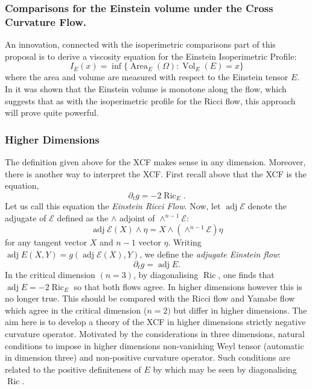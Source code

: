\documentclass[12pt]{amsart}
\begin{document}
\subsubsection*{Comparisons for the Einstein volume under the Cross Curvature Flow.}
\label{sec:orgheadline10}
An innovation, connected with the isoperimetric comparisons part of this proposal is to derive a viscosity equation for the Einstein Isoperimetric Profile:
\[
I_E (x) = \inf\{\operatorname{Area}_E (\Omega) : \operatorname{Vol}_E (E) = x\}
\]
where the area and volume are measured with respect to the Einstein tensor \(E\). In \cite{MR2055396} it was shown that the Einstein volume is monotone along the flow, which suggests that as with the isoperimetric profile for the Ricci flow, this approach will prove quite powerful.

\subsubsection*{Higher Dimensions}
\label{sec:orgheadline11}
The definition given above for the XCF makes sense in any dimension. Moreover, there is another way to interpret the XCF. First recall above that the XCF is the equation,
\[
\partial_t g = -2 \operatorname{Ric}_E.
\]
Let us call this equation the \emph{Einstein Ricci Flow}. Now, let \(\operatorname{adj} \mathcal{E}\) denote the adjugate of \(\mathcal{E}\) defined as the \(\wedge\) adjoint of \(\wedge^{n-1} \mathcal{E}\):
\[
\operatorname{adj} \mathcal{E} (X) \wedge \eta = X \wedge (\wedge^{n-1} \mathcal{E}) \eta
\]
for any tangent vector \(X\) and \(n-1\) vector \(\eta\). Writing \(\operatorname{adj} E (X, Y) = g(\operatorname{adj} \mathcal{E} (X), Y)\), we define the \emph{adjugate Einstein flow}:
\[
\partial_t g = \operatorname{adj} E.
\]
In the critical dimension \((n=3)\), by diagonalising \(\operatorname{Ric}\), one finds that \(\operatorname{adj} E = -2\operatorname{Ric}_E\) so that both flows agree. In higher dimensions however this is no longer true. This should be compared with the Ricci flow and Yamabe flow which agree in the critical dimension (\(n=2)\) but differ in higher dimensions. The aim here is to develop a theory of the XCF in higher dimensions strictly negative curvature operator. Motivated by the considerations in three dimensions, natural conditions to impose in higher dimensions  non-vanishing Weyl tensor (automatic in dimension three) and non-positive curvature operator. Such conditions are related to the positive definiteness of \(E\) by which may be seen by diagonalising \(\operatorname{Ric}\).
\end{document}
